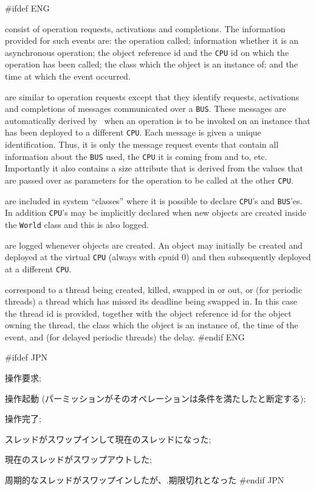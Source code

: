 \documentclass[\pformat,12pt]{article}
\begin{document}
\begin{description}
#ifdef ENG
\item[Object history events] consist of operation requests, activations and
completions. The information provided for such events are: the
operation called; information whether it is an asynchronous operation;
the object reference id and the \texttt{CPU} id on which the operation has
been called; the class which the object is an instance of; and the
time at which the event occurred.

\item[Message events] are similar to operation requests except that they
    identify requests, activations and completions of messages communicated
    over a \texttt{BUS}. These messages are automatically derived by 
    \VDMTools\ when an operation is to be invoked on an instance that has been
    deployed to a different \texttt{CPU}. Each message is given a unique
    identification. Thus, it is only the message request events that contain
    all information about the \texttt{BUS} used, the \texttt{CPU} it is 
    coming from and to, etc. Importantly it also contains a size attribute
    that is derived from the values that are passed over as parameters for
    the operation to be called at the other \texttt{CPU}. 

\item[Declaration events] are included in system ``classes'' where
    it is possible to declare
    \texttt{CPU}'s and \texttt{BUS}'es. In addition \texttt{CPU}'s may be
    implicitly declared when new objects are created inside the \texttt{World}
    class and this is also logged.

\item[Deployment events] are logged whenever objects are created. 
     An object may initially be created and deployed at the virtual 
     \texttt{CPU} (always with cpuid 0) and then subsequently deployed
     at a different \texttt{CPU}.

\item[Thread events] correspond to a thread being created, killed,
swapped in or out, or (for
periodic threads) a thread which has missed its deadline being swapped
in. In this case the thread id is provided, together with the object
reference id for the object owning the thread, the class which the
object is an instance of, the time of the event, and (for delayed
periodic threads) the delay.
#endif ENG

#ifdef JPN
\item 操作要求;
\item 操作起動 (パーミッションがそのオペレーションは条件を満たしたと断定する);
\item 操作完了;
\item スレッドがスワップインして現在のスレッドになった;
\item 現在のスレッドがスワップアウトした;
\item 周期的なスレッドがスワップインしたが、.期限切れとなった
#endif JPN
\end{description}
\end{document}

